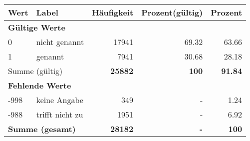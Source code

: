      \begin{longtable}{lXrrr}
     \toprule
     \textbf{Wert} & \textbf{Label} & \textbf{Häufigkeit} & \textbf{Prozent(gültig)} & \textbf{Prozent} \\
     \endhead
     \midrule
     \multicolumn{5}{l}{\textbf{Gültige Werte}}\\

     0 &
     \multicolumn{1}{X}{ nicht genannt   } &


       \num{17941} &
       \num[round-mode=places,round-precision=2]{69,32} &
         \num[round-mode=places,round-precision=2]{63,66} \\

     1 &
     \multicolumn{1}{X}{ genannt   } &


       \num{7941} &
       \num[round-mode=places,round-precision=2]{30,68} &
         \num[round-mode=places,round-precision=2]{28,18} \\
     \midrule
     \multicolumn{2}{l}{Summe (gültig)} &
       \textbf{\num{25882}} &
     \textbf{100} &
       \textbf{\num[round-mode=places,round-precision=2]{91,84}} \\
     \multicolumn{5}{l}{\textbf{Fehlende Werte}}\\
       -998 &
       keine Angabe &
         \num{349} &
        - &
         \num[round-mode=places,round-precision=2]{1,24} \\
       -988 &
       trifft nicht zu &
         \num{1951} &
        - &
         \num[round-mode=places,round-precision=2]{6,92} \\
     \midrule
     \multicolumn{2}{l}{\textbf{Summe (gesamt)}} &
          \textbf{\num{28182}} &
        \textbf{-} &
        \textbf{100} \\
     \bottomrule
     \end{longtable}
     
